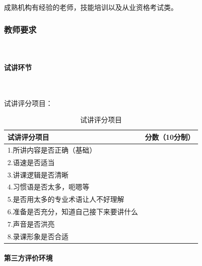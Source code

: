成熟机构有经验的老师，技能培训以及从业资格考试类。

\subsubsection{教师要求}\

\paragraph{试讲环节}\

试讲评分项目：
\begin{table}[H]
  \centering
  \caption{试讲评分项目}
    \begin{tabular}{|p{16.165em}|r|}
    \hline
    \textcolor[rgb]{ .298,  .282,  .239}{试讲评分项目} & \multicolumn{1}{p{16.945em}|}{\textcolor[rgb]{ .298,  .282,  .239}{分数（10分制）}} \\
    \hline
    \textcolor[rgb]{ .298,  .282,  .239}{1.所讲内容是否正确（基础）} & \textcolor[rgb]{ .298,  .282,  .239}{} \\
    \hline
    \textcolor[rgb]{ .298,  .282,  .239}{2.语速是否适当} & \textcolor[rgb]{ .298,  .282,  .239}{} \\
    \hline
    \textcolor[rgb]{ .298,  .282,  .239}{3.讲课逻辑是否清晰} & \textcolor[rgb]{ .298,  .282,  .239}{} \\
    \hline
    \textcolor[rgb]{ .298,  .282,  .239}{4.习惯语是否太多，呃嗯等} & \textcolor[rgb]{ .298,  .282,  .239}{} \\
    \hline
    \textcolor[rgb]{ .298,  .282,  .239}{5.是否用太多的专业术语让人不好理解} & \textcolor[rgb]{ .298,  .282,  .239}{} \\
    \hline
    \textcolor[rgb]{ .298,  .282,  .239}{6.准备是否充分，知道自己接下来要讲什么} & \textcolor[rgb]{ .298,  .282,  .239}{} \\
    \hline
    \textcolor[rgb]{ .298,  .282,  .239}{7.声音是否洪亮} & \textcolor[rgb]{ .298,  .282,  .239}{} \\
    \hline
    \textcolor[rgb]{ .298,  .282,  .239}{8.录课形象是否合适} & \textcolor[rgb]{ .298,  .282,  .239}{} \\
    \hline
    \end{tabular}%
  \label{tab:sjpfxm}%
\end{table}%


\paragraph{第三方评价环境}\

